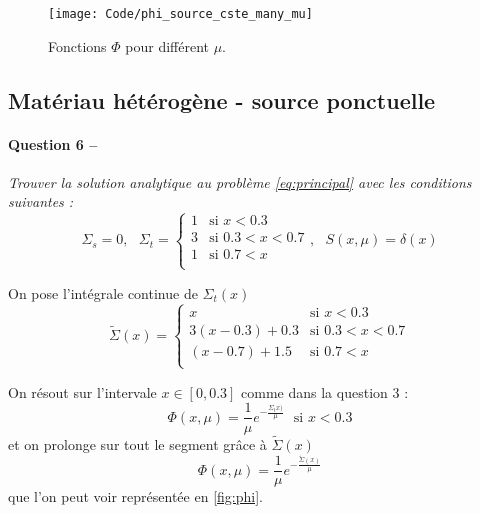 \message{ !name(rapport_monte_carlo.tex)}\documentclass[12pt,a4paper]{article}
\newcommand{\question}[2]{\paragraph{Question #1 --}\hspace{-7pt}\textit{#2} \\}
\newcommand{\intsigma}{\widetilde{\Sigma}}
\begin{document}
\begin{figure}[h]
  \centering
  \texttt{[image: Code/phi\_source\_cste\_many\_mu]}
  \caption{Fonctions $\Phi$ pour différent $\mu$.}
  \label{fig:cste_many_mu}
\end{figure}

\subsection{Matériau hétérogène - source ponctuelle}

\question{6}{Trouver la solution analytique au problème \autoref{eq:principal} avec les conditions suivantes :}

\begin{equation}
  \Sigma_s=0, ~~~
  \Sigma_t =
  \begin{cases}
    1 &\mbox{si } x<0.3 \\
    3 &\mbox{si } 0.3<x<0.7 \\
    1 &\mbox{si } 0.7<x \\
  \end{cases}
  , ~~~ S(x, \mu) = \delta(x)
\end{equation}

On pose l'intégrale continue de $\Sigma_t(x)$ 
\begin{equation}
  \intsigma(x) =
  \begin{cases}
    x &\mbox{si } x<0.3 \\
    3(x-0.3)+0.3 &\mbox{si } 0.3<x<0.7 \\
    (x-0.7)+1.5 &\mbox{si } 0.7<x \\
  \end{cases}
\end{equation}

On résout sur l'intervale $x\in[0,0.3]$ comme dans la question 3 :
\begin{equation}
  \Phi(x, \mu) = \frac{1}{\mu} e^{-\frac{\Sigma_t x)}{\mu}} ~~~ \mbox{si } x<0.3
\end{equation}
et on prolonge sur tout le segment grâce à $\intsigma(x)$ 
\begin{equation}
  \Phi(x, \mu) = \frac{1}{\mu} e^{-\frac{\intsigma(x)}{\mu}} 
\end{equation}
que l'on peut voir représentée en \autoref{fig:phi}.
\end{document}

